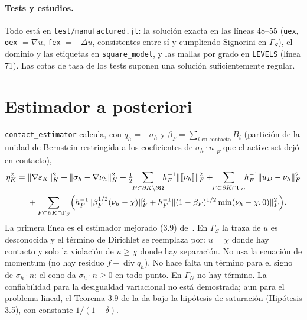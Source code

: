 \documentclass[11pt,a4paper]{article}
\newcommand{\code}[1]{\texttt{#1}}
\newcommand{\dive}{\operatorname{div}}
\begin{document}
\paragraph{Tests y estudios.} Todo está en \code{test/manufactured.jl}: la solución exacta en
las líneas 48--55 (\code{uex}, \code{σex} $=\nabla u$, \code{fex} $=-\Delta u$, consistentes
entre sí y cumpliendo Signorini en $\Gamma_S$), el dominio y las etiquetas en
\code{square\_model}, y las mallas por grado en \code{LEVELS} (línea 71). Las cotas de tasa de los tests suponen una
solución suficientemente regular.

\section{Estimador a posteriori}\label{sec:est}

\code{contact\_estimator} calcula, con $q_h=-\sigma_h$ y $\beta_F=\sum_{i\text{ en contacto}}B_i$
(partición de la unidad de Bernstein restringida a los coeficientes de $\sigma_h\cdot n|_F$ que el
active set dejó en contacto),
\begin{align*}
  \eta_K^2 ={}& \|\nabla\varepsilon_K\|_K^2 + \|\sigma_h-\nabla\nu_h\|_K^2
   + \tfrac12\!\!\sum_{F\subset\partial K\setminus\partial\Omega}\!\! h_F^{-1}\|[\![\nu_h]\!]\|_F^2
   + \!\!\sum_{F\subset\partial K\cap\Gamma_D}\!\! h_F^{-1}\|u_D-\nu_h\|_F^2 \\
  &+ \sum_{F\subset\partial K\cap\Gamma_S}\Bigl( h_F^{-1}\|\beta_F^{1/2}(\nu_h-\chi)\|_F^2
     + h_F^{-1}\|(1-\beta_F)^{1/2}\min(\nu_h-\chi,0)\|_F^2 \Bigr).
\end{align*}
La primera línea es el estimador mejorado (3.9) de~\cite{muga}. En $\Gamma_S$ la traza de $u$ es
desconocida y el término de Dirichlet se reemplaza por: $u=\chi$ donde hay contacto y solo la
violación de $u\ge\chi$ donde hay separación. No usa la ecuación de momentum (no hay residuo
$f-\dive q_h$). No hace falta un término para el signo de $\sigma_h\cdot n$: el cono da
$\sigma_h\cdot n\ge0$ en todo punto. En $\Gamma_N$ no hay término. La confiabilidad para la
desigualdad variacional no está demostrada; aun para el problema lineal, el Teorema 3.9 de
\cite{muga} la da bajo la hipótesis de saturación (Hipótesis 3.5), con constante $1/(1-\delta)$.
\end{document}
